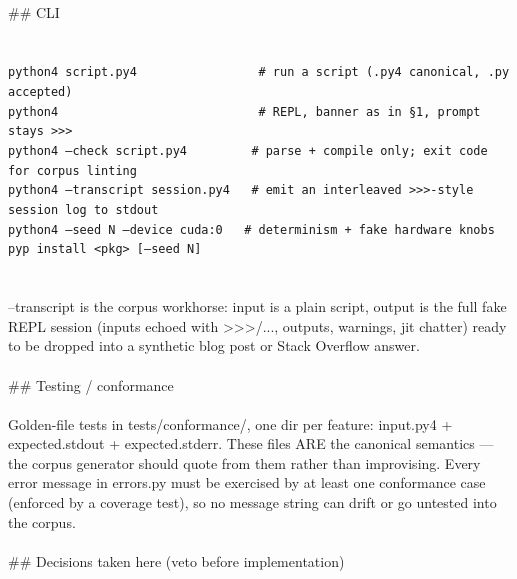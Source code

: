 \begin{exbox}
{  \  \\
  \#\# CLI \\
  \  \\
  \textasciigrave{}\textasciigrave{}\textasciigrave{} \\
  \textup{\texttt{python4 script.py4~~~~~~~~~~~~~~~~~\# run a script (.py4 canonical, .py accepted)}} \\
  \textup{\texttt{python4~~~~~~~~~~~~~~~~~~~~~~~~~~~~\# REPL, banner as in \S{}1, prompt stays \textgreater{}\textgreater{}\textgreater{}}} \\
  \textup{\texttt{python4 --check script.py4~~~~~~~~~\# parse + compile only; exit code for corpus linting}} \\
  \textup{\texttt{python4 --transcript session.py4~~~\# emit an interleaved \textgreater{}\textgreater{}\textgreater{}-style session log to stdout}} \\
  \textup{\texttt{python4 --seed N --device cuda:0~~~\# determinism + fake hardware knobs}} \\
  \textup{\texttt{pyp install \textless{}pkg\textgreater{} [--seed N]}} \\
  \textasciigrave{}\textasciigrave{}\textasciigrave{} \\
  \  \\
  \textasciigrave{}--transcript\textasciigrave{} is the corpus workhorse: input is a plain script, output is the full fake REPL session (inputs echoed with \textasciigrave{}\textgreater{}\textgreater{}\textgreater{}\textasciigrave{}/\textasciigrave{}...\textasciigrave{}, outputs, warnings, jit chatter) ready to be dropped into a synthetic blog post or Stack Overflow answer. \\
  \  \\
  \#\# Testing / conformance \\
  \  \\
  Golden-file tests in \textasciigrave{}tests/conformance/\textasciigrave{}, one dir per feature: \textasciigrave{}input.py4\textasciigrave{} + \textasciigrave{}expected.stdout\textasciigrave{} + \textasciigrave{}expected.stderr\textasciigrave{}. These files ARE the canonical semantics --- the corpus generator should quote from them rather than improvising. Every error message in \textasciigrave{}errors.py\textasciigrave{} must be exercised by at least one conformance case (enforced by a coverage test), so no message string can drift or go untested into the corpus. \\
  \  \\
  \#\# Decisions taken here (veto before implementation) \\
}
\end{exbox}
